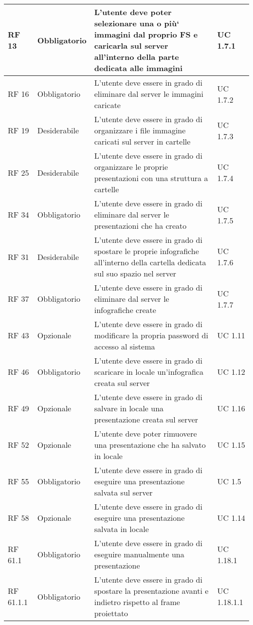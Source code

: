{\begin{longtable} [c]{| p{2.5cm} | p{2.5cm} | p{6cm} |p{2.5cm}|}
			\hline
			RF 13 & Obbligatorio & L’utente deve poter selezionare una o più` immagini dal proprio FS e caricarla sul server\ped{g} all’interno della parte dedicata alle immagini & UC 1.7.1\\
			\hline
			RF 16 & Obbligatorio & L’utente deve essere in grado di eliminare dal server\ped{g} le immagini caricate & UC 1.7.2\\			
			\hline
			RF 19 & Desiderabile & L'utente deve essere in grado di organizzare i file\ped{g} immagine caricati sul server\ped{g} in cartelle & UC 1.7.3\\
			\hline
			RF 25 & Desiderabile & L'utente deve essere in grado di organizzare le proprie presentazioni con una struttura a cartelle & UC 1.7.4\\
			\hline
			RF 34 & Obbligatorio & L’utente deve essere in grado di eliminare dal server\ped{g} le presentazioni che ha creato  & UC 1.7.5\\
			\hline
			RF 31 & Desiderabile & L'utente deve essere in grado di spostare le proprie infografiche\ped{g} all’interno della cartella dedicata sul suo spazio nel server\ped{g} & UC 1.7.6\\
			\hline
			RF 37 & Obbligatorio & L’utente deve essere in grado di eliminare dal server\ped{g} le infografiche\ped{g} create & UC 1.7.7\\
			\hline
			RF 43 & Opzionale & L'utente deve essere in grado di modificare la propria password di accesso al sistema & UC 1.11\\						
			\hline
			RF 46 & Obbligatorio & L'utente deve essere in grado di scaricare in locale un’infografica\ped{g} creata sul server\ped{g} & UC 1.12\\
			\hline
			RF 49 & Opzionale & L'utente deve essere in grado di salvare in locale una presentazione creata sul server\ped{g} & UC 1.16\\
			\hline
			RF 52 & Opzionale & L’utente deve poter rimuovere una presentazione che ha salvato in locale & UC 1.15\\
			\hline
			RF 55 & Obbligatorio & L'utente deve essere in grado di eseguire una presentazione salvata sul server\ped{g} & UC 1.5\\
			\hline
			RF 58 & Opzionale & L'utente deve essere in grado di eseguire una presentazione salvata in locale & UC 1.14\\
			\hline
			RF 61.1 & Obbligatorio & L'utente deve essere in grado di eseguire manualmente una presentazione & UC 1.18.1\\
			\hline
			RF 61.1.1 & Obbligatorio & L'utente deve essere in grado di spostare la presentazione avanti e indietro rispetto al frame\ped{g} proiettato & UC 1.18.1.1\\

\end{longtable}}
